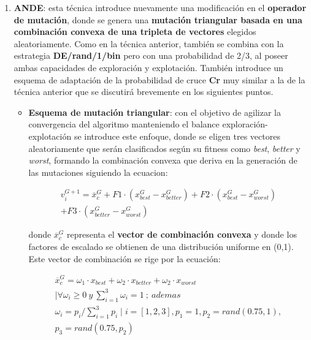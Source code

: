\begin{enumerate}
	\item \textbf{ANDE}: esta técnica introduce nuevamente una modificación en el \textbf{operador de mutación}, donde se genera una \textbf{mutación triangular basada en una combinación convexa de una tripleta de vectores} elegidos aleatoriamente. Como en la técnica anterior, también se combina con la estrategia \textbf{DE/rand/1/bin} pero con una probabilidad de 2/3, al poseer ambas capacidades de exploración y explotación. También introduce un esquema de adaptación de la probabilidad de cruce \textbf{Cr} muy similar a la de la técnica anterior que se discutirá brevemente en los siguientes puntos.
	
	\begin{itemize}
		\item \textbf{Esquema de mutación triangular}: con el objetivo de agilizar la convergencia del algoritmo manteniendo el balance exploración-explotación se introduce este enfoque, donde se eligen tres vectores aleatoriamente que serán clasificados según su fitness como \textit{best}, \textit{better} y \textit{worst}, formando la combinación convexa que deriva en la generación de las mutaciones siguiendo la ecuacion:
		
		\begin{equation}\label{eq:ANDE_Mut}
		\begin{gathered}
			v_i^{G+1} = \overline{x}_c^G + F1 \cdot (x_{best}^G -x_{better}^G) + F2 \cdot (x_{best}^G -x_{worst}^G) \\+ F3 \cdot (x_{better}^G -x_{worst}^G)
		\end{gathered}
		\end{equation}
		
		donde $\overline{x}_c^G$ representa el \textbf{vector de combinación convexa} y donde los factores de escalado se obtienen de una distribución uniforme en (0,1). Este vector de combinación se rige por la ecuación:
		
		\begin{equation}\label{eq:ANDE_VCC}
		\begin{gathered}
			\overline{x}_c^G = \omega_1 \cdot x_{best} + \omega_2 \cdot x_{better} + \omega_2 \cdot x_{worst} \\
			\mid \forall \omega_i \geq 0 \ y \ \sum_{i=1}^{3} \omega_i = 1 \ ; \ ademas \\
			\omega_i = p_i / \sum_{i=1}^{3}p_i  \mid i=[1,2,3], p_1=1, p_2 = rand(0.75,1),  \\p_3 = rand(0.75,p_2) 
		\end{gathered}
		\end{equation}
		

\end{itemize}
\end{enumerate}
